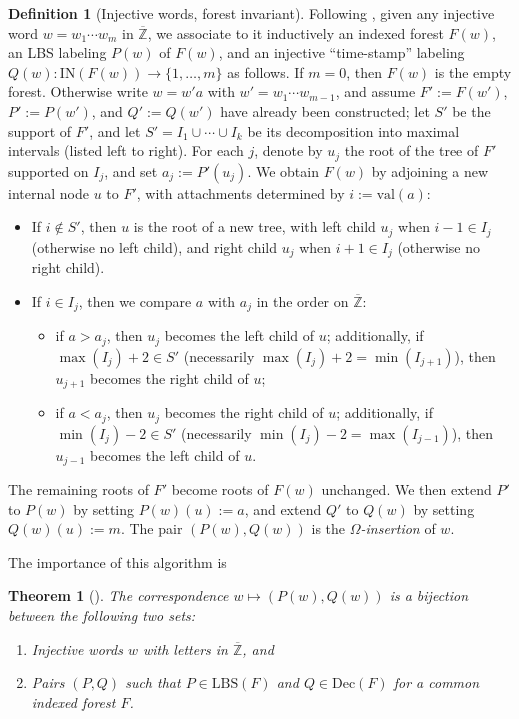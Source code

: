 \documentclass{amsart}
\newtheorem{theorem}{Theorem}[section]
\theoremstyle{definition}
\newtheorem{definition}[lemma]{Definition}
\theoremstyle{remark}
\numberwithin{equation}{subsection}
\begin{document}
\begin{definition}[Injective words, forest invariant]
Following \cite{nadeau2024forest}, given any injective word $w = w_1\cdots w_m$ in $\overline{\mathbb{Z}}$, we associate to it inductively an indexed forest $F(w)$, an LBS labeling $P(w)$ of $F(w)$, and an injective ``time-stamp'' labeling $Q(w):\mathrm{IN}(F(w))\to\{1,\ldots,m\}$ as follows. If $m=0$, then $F(w)$ is the empty forest. Otherwise write $w = w'a$ with $w' = w_1\cdots w_{m-1}$, and assume $F' := F(w')$, $P' := P(w')$, and $Q' := Q(w')$ have already been constructed; let $S'$ be the support of $F'$, and let $S' = I_1\cup\cdots\cup I_k$ be its decomposition into maximal intervals (listed left to right). For each $j$, denote by $u_j$ the root of the tree of $F'$ supported on $I_j$, and set $a_j := P'(u_j)$. We obtain $F(w)$ by adjoining a new internal node $u$ to $F'$, with attachments determined by $i := \mathrm{val}(a)$:
\begin{itemize}
\item If $i\notin S'$, then $u$ is the root of a new tree, with left child $u_j$ when $i-1\in I_j$ (otherwise no left child), and right child $u_j$ when $i+1\in I_j$ (otherwise no right child).
\item If $i\in I_j$, then we compare $a$ with $a_j$ in the order on $\overline{\mathbb{Z}}$:
\begin{itemize}
\item if $a>a_j$, then $u_j$ becomes the left child of $u$; additionally, if $\max(I_j)+2\in S'$ (necessarily $\max(I_j)+2 = \min(I_{j+1})$), then $u_{j+1}$ becomes the right child of $u$;
\item if $a<a_j$, then $u_j$ becomes the right child of $u$; additionally, if $\min(I_j)-2\in S'$ (necessarily $\min(I_j)-2=\max(I_{j-1})$), then $u_{j-1}$ becomes the left child of $u$.
\end{itemize}
\end{itemize}
The remaining roots of $F'$ become roots of $F(w)$ unchanged. We then extend $P'$ to $P(w)$ by setting $P(w)(u) := a$, and extend $Q'$ to $Q(w)$ by setting $Q(w)(u) := m$. The pair $(P(w), Q(w))$ is the \emph{$\Omega$-insertion} of $w$.
\end{definition}

The importance of this algorithm is

\begin{theorem}[{\cite[Theorem~5.1]{nadeau2024forest}}]
The correspondence $w\mapsto (P(w), Q(w))$ is a bijection between the following two sets:
\begin{enumerate}
\item Injective words $w$ with letters in $\overline{\mathbb{Z}}$, and
\item Pairs $(P, Q)$ such that $P \in \mathrm{LBS}(F)$ and $Q \in \mathrm{Dec}(F)$ for a common indexed forest $F$.
\end{enumerate}
\end{theorem}
\end{document}
